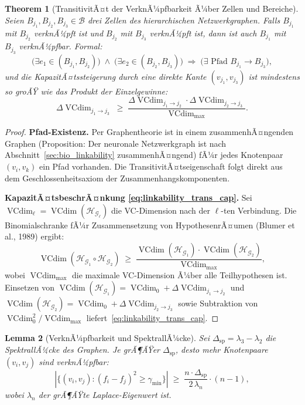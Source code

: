 ﻿\documentclass[12pt, a4paper, openany]{report}
\newtheorem{theorem}{Theorem}[chapter]
\newtheorem{lemma}[theorem]{Lemma}
\newcommand{\calG}{\mathcal{G}}
\newcommand{\calH}{\mathcal{H}}
\newcommand{\calB}{\mathcal{B}}
\DeclareMathOperator{\VC}{VCdim}
\begin{document}
\begin{theorem}[TransitivitÃ¤t der VerknÃ¼pfbarkeit Ã¼ber Zellen und Bereiche]
\label{thm:linkability_transitivity}
Seien $B_{j_1}, B_{j_2}, B_{j_3} \in \calB$ drei Zellen des hierarchischen
Netzwerkgraphen.  Falls $B_{j_1}$ mit $B_{j_2}$ verknÃ¼pft ist und
$B_{j_2}$ mit $B_{j_3}$ verknÃ¼pft ist, dann ist auch $B_{j_1}$ mit $B_{j_3}$
verknÃ¼pfbar.  Formal:
\begin{equation}
  \label{eq:linkability_transitivity}
  \bigl(\exists e_1 \in (B_{j_1}, B_{j_2})\bigr)
  \;\wedge\;
  \bigl(\exists e_2 \in (B_{j_2}, B_{j_3})\bigr)
  \;\Rightarrow\;
  \bigl(\exists \text{ Pfad } B_{j_1} \to B_{j_3}\bigr),
\end{equation}
und die KapazitÃ¤tssteigerung durch eine direkte Kante $(v_{j_1}, v_{j_3})$
ist mindestens so groÃŸ wie das Produkt der Einzelgewinne:
\begin{equation}
  \label{eq:linkability_trans_cap}
  \Delta\VC_{j_1 \to j_3}
  \;\geq\;
  \frac{\Delta\VC_{j_1 \to j_2} \cdot \Delta\VC_{j_2 \to j_3}}
       {\VC_{\max}}.
\end{equation}
\end{theorem}

\begin{proof}
\textbf{Pfad-Existenz.}
Per Graphentheorie ist in einem zusammenhÃ¤ngenden Graphen (Proposition:
Der neuronale Netzwerkgraph ist nach Abschnitt~\ref{sec:bio_linkability}
zusammenhÃ¤ngend) fÃ¼r jedes Knotenpaar $(v_{i}, v_{k})$ ein Pfad vorhanden.
Die TransitivitÃ¤tseigenschaft folgt direkt aus dem Geschlossenheitsaxiom
der Zusammenhangskomponenten.

\textbf{KapazitÃ¤tsbeschrÃ¤nkung \eqref{eq:linkability_trans_cap}.}
Sei $\VC_\ell = \VC(\calH_{\calG_\ell})$ die VC-Dimension nach der
$\ell$-ten Verbindung.  Die Binomialschranke fÃ¼r Zusammensetzung von
HypothesenrÃ¤umen (Blumer et al., 1989) ergibt:
\[
  \VC(\calH_{\calG_1} \circ \calH_{\calG_2})
  \;\geq\;
  \frac{\VC(\calH_{\calG_1}) \cdot \VC(\calH_{\calG_2})}{\VC_{\max}},
\]
wobei $\VC_{\max}$ die maximale VC-Dimension Ã¼ber alle Teilhypothesen ist.
Einsetzen von $\VC(\calH_{\calG_1}) = \VC_0 + \Delta\VC_{j_1 \to j_2}$
und $\VC(\calH_{\calG_2}) = \VC_0 + \Delta\VC_{j_2 \to j_3}$ sowie
Subtraktion von $\VC_0^2 / \VC_{\max}$ liefert~\eqref{eq:linkability_trans_cap}.
\end{proof}

\begin{lemma}[VerknÃ¼pfbarkeit und SpektrallÃ¼cke]
\label{lem:linkability_gap}
Sei $\Delta_{\mathrm{sp}} = \lambda_3 - \lambda_2$ die SpektrallÃ¼cke des
Graphen.  Je grÃ¶ÃŸer $\Delta_{\mathrm{sp}}$, desto mehr Knotenpaare
$(v_i, v_j)$ sind verknÃ¼pfbar:
\begin{equation}
  \label{eq:linkability_gap_bound}
  |\{(v_i, v_j) : (f_i - f_j)^2 \geq \gamma_{\min}\}|
  \;\geq\;
  \frac{n \cdot \Delta_{\mathrm{sp}}}{2\,\lambda_n} \cdot (n-1),
\end{equation}
wobei $\lambda_n$ der grÃ¶ÃŸte Laplace-Eigenwert ist.
\end{lemma}
\end{document}
